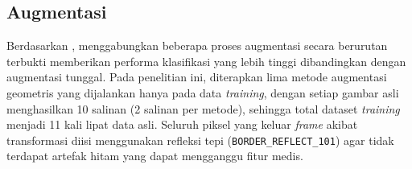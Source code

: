 \subsection{Augmentasi}
Berdasarkan \autocite{goceri2023medical}, menggabungkan beberapa proses augmentasi 
secara berurutan terbukti memberikan performa klasifikasi yang lebih tinggi dibandingkan 
dengan augmentasi tunggal. Pada penelitian ini, diterapkan lima metode augmentasi 
geometris yang dijalankan hanya pada data \textit{training}, dengan setiap gambar asli 
menghasilkan 10 salinan (2 salinan per metode), sehingga total dataset \textit{training} 
menjadi 11 kali lipat data asli. Seluruh piksel yang keluar \textit{frame} akibat 
transformasi diisi menggunakan refleksi tepi (\texttt{BORDER\_REFLECT\_101}) agar tidak 
terdapat artefak hitam yang dapat mengganggu fitur medis. 


